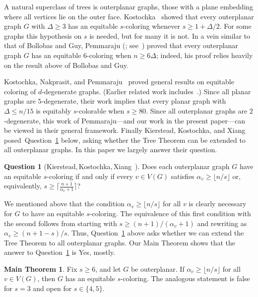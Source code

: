 \documentclass[11pt]{article}
\theoremstyle{definition}
\newtheorem*{mainthm}{Main Theorem}
\newtheorem{ques}[thmA]{Question}
\newcommand\floor[1]{\lfloor#1\rfloor}
\newcommand\ceil[1]{\lceil#1\rceil}
\renewcommand\ge\geqslant
\renewcommand\le\leqslant
\begin{document}
A natural superclass of trees is outerplanar graphs, those with a plane
embedding where all vertices lie on the outer face.  Kostochka~\cite{kostochka-outerplanar} showed that every outerplanar graph $G$ with 
$\Delta\ge 3$ has an equitable $s$-coloring whenever $s\ge 1+\Delta/2$.  For some graphs this hypothesis on $s$ is needed, but for many it is not.  
In a vein similar to that of Bollobas and Guy, Pemmaraju (\cite{pemmaraju-manuscript}; see~\cite[Theorem~7]{pemmaraju-extends}) proved that every 
outerplanar graph $G$ has an equitable $6$-coloring when $n\ge 6\Delta$; indeed, his proof relies heavily on the result above of Bollobas and Guy. 

Kostochka, Nakprasit, and Pemmaraju~\cite{KNP,PNK-SODA} proved general results on equitable coloring of $d$-degenerate graphs.  
(Earlier related work includes~\cite{KN}.)
Since all planar graphs are $5$-degenerate, their work implies that every planar graph with $\Delta \le n/15$ is equitably $s$-colorable when $s\ge 80$.
Since all outerplanar graphs are
$2$-degenerate, this work of Pemmaraju---and our work in the present paper---can be viewed in their general framework. 
Finally Kierstead, Kostochka, and Xiang~\cite{KKX-survey} posed~Question~\ref{outerplanar-ques} below, 
asking whether the Tree Theorem can be extended to all outerplanar graphs.  
In this paper we largely answer their question. 

\begin{ques}[Kierstead,\,Kostochka,\,Xiang~\cite{KKX-survey}]
\label{outerplanar-ques}
\label{KKX-ques}
Does each outerplanar graph $G$ have an equitable $s$-coloring
if and only if every $v\in V(G)$ satisfies $\alpha_v\ge \floor{n/s}$ or, equivalently, 
$s\ge \ceil{\frac{n+1}{\alpha_v+1}}$?
\end{ques}

\noindent 
We mentioned above that the condition $\alpha_v\ge \floor{n/s}$ for all $v$ is clearly necessary for $G$ to have an equitable $s$-coloring.
The equivalence of this first condition with the second follows from starting with $s\ge (n+1)/(\alpha_v+1)$ and rewriting as $\alpha_v\ge (n+1-s)/s$.
Thus, Question~\ref{outerplanar-ques} above
asks whether we can extend the Tree Theorem to all outerplanar graphs.
Our Main Theorem shows that the answer to Question~\ref{outerplanar-ques} is Yes, mostly. 

\begin{mainthm}
Fix $s\ge 6$, and let $G$ be outerplanar.  If $\alpha_v\ge \floor{n/s}$ for all $v\in V(G)$, 
then $G$ has an equitable $s$-coloring.  The analogous statement is false for $s=3$ and open for $s\in\{4,5\}$.
\end{mainthm}
\end{document}
